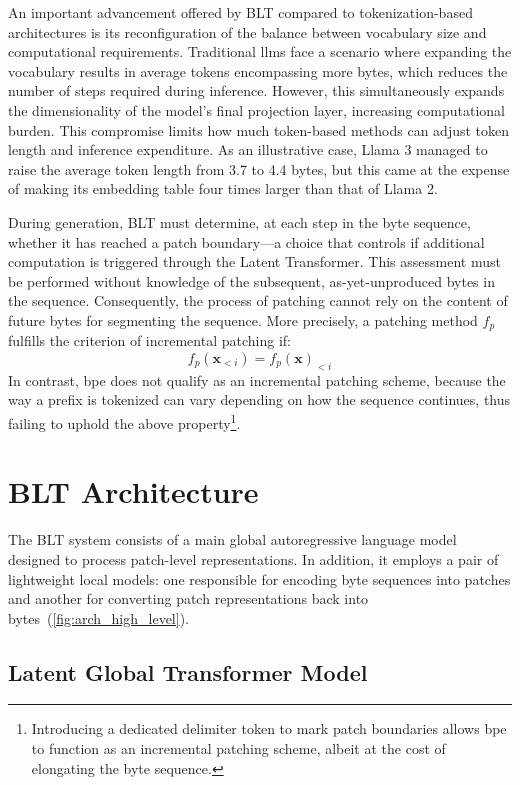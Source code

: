 An important advancement offered by {\textsc BLT} compared to tokenization-based architectures is its reconfiguration of the balance between vocabulary size and computational requirements. Traditional llms face a scenario where expanding the vocabulary results in average tokens encompassing more bytes, which reduces the number of steps required during inference. However, this simultaneously expands the dimensionality of the model’s final projection layer, increasing computational burden. This compromise limits how much token-based methods can adjust token length and inference expenditure. As an illustrative case, Llama 3 managed to raise the average token length from 3.7 to 4.4 bytes, but this came at the expense of making its embedding table four times larger than that of Llama 2.

During generation, {\textsc BLT} must determine, at each step in the byte sequence, whether it has reached a patch boundary—a choice that controls if additional computation is triggered through the Latent Transformer. This assessment must be performed without knowledge of the subsequent, as-yet-unproduced bytes in the sequence. Consequently, the process of patching cannot rely on the content of future bytes for segmenting the sequence. More precisely, a patching method $f_p$ fulfills the criterion of incremental patching if:
$$f_p(\pmb{x}_{<i}) = f_p(\pmb{x})_{<i}$$
In contrast, bpe does not qualify as an incremental patching scheme, because the way a prefix is tokenized can vary depending on how the sequence continues, thus failing to uphold the above property\footnote{Introducing a dedicated delimiter token to mark patch boundaries allows bpe to function as an incremental patching scheme, albeit at the cost of elongating the byte sequence.}.

\section{{\textsc BLT} Architecture}
\label{section:architecture}
The {\textsc BLT} system consists of a main global autoregressive language model designed to process patch-level representations. In addition, it employs a pair of lightweight local models: one responsible for encoding byte sequences into patches and another for converting patch representations back into bytes~(\autoref{fig:arch_high_level}).

\subsection{Latent Global Transformer Model}

